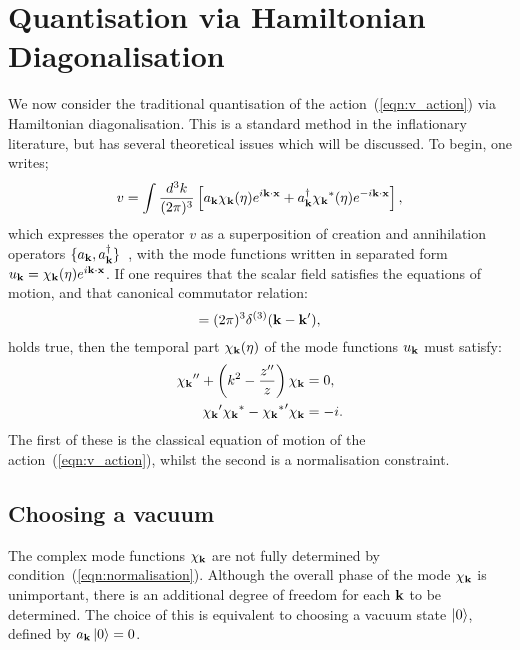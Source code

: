 \section{Quantisation via Hamiltonian Diagonalisation}                                
\label{sec:mukhanov}
We now consider the traditional quantisation of the action~(\ref{eqn:v_action}) via Hamiltonian diagonalisation. This is a standard method in the inflationary literature, but has several theoretical issues which will be discussed. To begin, one writes;
\begin{equation}
  v = \int \frac{d^3 k}{(2\pi)^3} \left[ a_{\mathbf{k}} \chi_{\mathbf{k}}(\eta)e^{i\mathbf{k}\cdot\mathbf{x}} + a_{\mathbf{k}}^{\dagger} {\chi_{\mathbf{k}}}^\ast(\eta)e^{-i\mathbf{k}\cdot\mathbf{x}} \right], 
  \label{eqn:v_quant}
\end{equation}
which expresses the operator $v$ as a superposition of creation and annihilation operators $\{a_{\mathbf{k}},a_{\mathbf{k}}^\dagger\}$~\cite{Mukhanov+2007}, with the mode functions written in separated form ${u_{\mathbf{k}} = \chi_{\mathbf{k}}(\eta) e^{i\mathbf{k}\cdot\mathbf{x}}}$. If one requires that the scalar field satisfies the equations of motion, and that canonical commutator relation:
\begin{equation}
  [ a_\bk^{\phantom\dagger} a_{\prm{\bk}}^{\dagger} ] = (2\pi)^3\delta^{(3)}(\bk-\prm{\bk}),
  \label{eqn:commutator}
\end{equation}
holds true, then the temporal part $\chi_{\mathbf{k}}(\eta)$ of the mode functions $u_{\mathbf{k}}$ must satisfy:
\begin{align}
  {{\chi_{\mathbf{k}}}^{\prime\prime}} + \left( k^2 - \frac{{{z}^{\prime\prime}}}{z} \right)\chi_{\mathbf{k}} &= 0,
  \label{eqn:mode_mukhanov}
  \\
  {{\chi_{\mathbf{k}}}^\prime} {\chi_{\mathbf{k}}}^\ast - {{{\chi_{\mathbf{k}}}^\ast}^\prime} \chi_{\mathbf{k}} &= -i.
  \label{eqn:normalisation}
\end{align}
The first of these is the classical equation of motion of the action~(\ref{eqn:v_action}), whilst the second is a normalisation constraint.

\subsection{Choosing a vacuum}
\label{sec:hamiltonian_diagonalisation}
The complex mode functions $\chi_{\mathbf{k}}$ are not fully determined by condition~(\ref{eqn:normalisation}). Although the overall phase of the mode $\chi_{\mathbf{k}}$ is unimportant, there is an additional degree of freedom for each $\mathbf{k}$ to be determined. The choice of this is equivalent to choosing a vacuum state $\left|0\right\rangle$, defined by $a_{\mathbf{k}}\left|0\right\rangle=0$.

